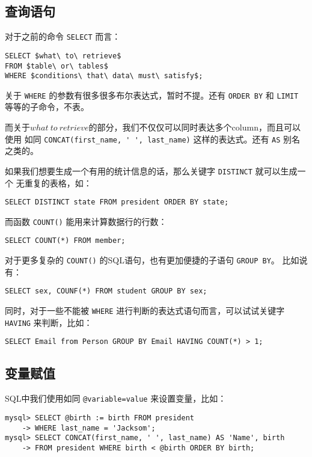 \subsection{查询语句}

对于之前的命令 \verb|SELECT| 而言：
\begin{lstlisting}
SELECT $what\ to\ retrieve$
FROM $table\ or\ tables$
WHERE $conditions\ that\ data\ must\ satisfy$;
\end{lstlisting}

关于 \verb|WHERE| 的参数有很多很多布尔表达式，暂时不提。还有 \verb|ORDER BY| 和 
\verb|LIMIT| 等等的子命令，不表。

而关于$what\ to\ retrieve$的部分，我们不仅仅可以同时表达多个column，而且可以使用
如同 \verb|CONCAT(first_name, ' ', last_name)| 这样的表达式。还有 \verb|AS| 别名
之类的。

如果我们想要生成一个有用的统计信息的话，那么关键字 \verb|DISTINCT| 就可以生成一个
无重复的表格，如：
\begin{lstlisting}
SELECT DISTINCT state FROM president ORDER BY state;
\end{lstlisting}

而函数 \verb|COUNT()| 能用来计算数据行的行数：
\begin{lstlisting}
SELECT COUNT(*) FROM member;
\end{lstlisting}

对于更多复杂的 \verb|COUNT()| 的SQL语句，也有更加便捷的子语句 \verb|GROUP BY|。
比如说有：
\begin{lstlisting}
SELECT sex, COUNF(*) FROM student GROUP BY sex;
\end{lstlisting}

同时，对于一些不能被 \verb|WHERE| 进行判断的表达式语句而言，可以试试关键字 %
\verb|HAVING| 来判断，比如：
\begin{lstlisting}
SELECT Email from Person GROUP BY Email HAVING COUNT(*) > 1;
\end{lstlisting}

\subsection{变量赋值}

SQL中我们使用如同 \verb|@variable=value| 来设置变量，比如：
\begin{lstlisting}
mysql> SELECT @birth := birth FROM president
    -> WHERE last_name = 'Jacksom';
mysql> SELECT CONCAT(first_name, ' ', last_name) AS 'Name', birth 
    -> FROM president WHERE birth < @birth ORDER BY birth;
\end{lstlisting}

